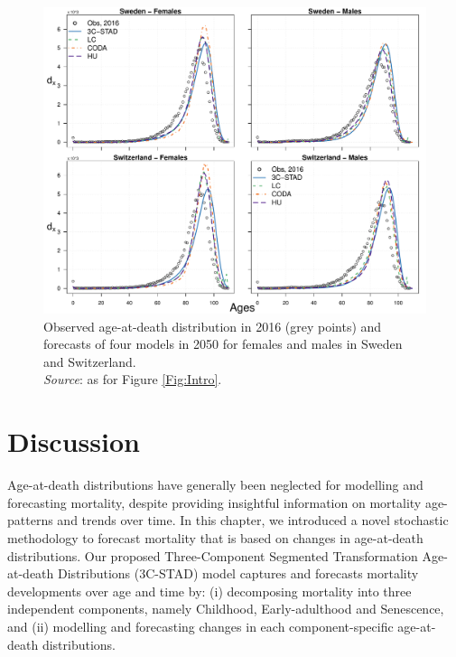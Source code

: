 \documentclass[11pt, a4paper]{article}
\begin{document}
\begin{figure}[t]
	\begin{center}
		\includegraphics[scale=0.64]{./Figures/F6.pdf}
		\caption{Observed age-at-death distribution in 2016 (grey points) and forecasts of four models in 2050 for females and males in Sweden and Switzerland. \\\footnotesize{\textit{Source}: as for Figure \ref{Fig:Intro}.} \label{Fig:DXfore}}		
	\end{center}
\end{figure}


\section{Discussion}\label{Sec:Discussion}

Age-at-death distributions have generally been neglected for modelling and forecasting mortality, despite providing insightful information on mortality age-patterns and trends over time. In this chapter, we introduced a novel stochastic methodology to forecast mortality that is based on changes in age-at-death distributions. Our proposed Three-Component Segmented Transformation Age-at-death Distributions (3C-STAD) model captures and forecasts mortality developments over age and time by: (i) decomposing mortality into three independent components, namely Childhood, Early-adulthood and Senescence, and (ii) modelling and forecasting changes in each component-specific age-at-death distributions. 
\end{document}
